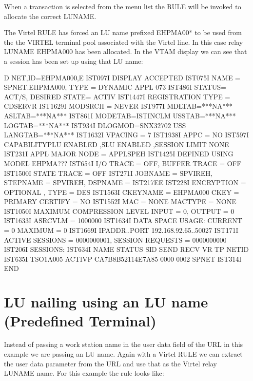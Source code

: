 \documentclass[letterpaper,10pt,english]{sphinxmanual}
\begin{document}

When a transaction is selected from the menu list the RULE will be invoked to allocate the correct LUNAME.


The Virtel RULE has forced an LU name prefixed EHPMA00* to be used from the the VIRTEL terminal pool associated with the Virtel line. In this case relay LUNAME EHPMA000 has been allocated. In the VTAM display we can see that a session has been set up using that LU name:

\begin{sphinxVerbatim}[commandchars=\\\{\}]
D NET,ID=EHPMA000,E
IST097I DISPLAY ACCEPTED
IST075I NAME = SPNET.EHPMA000, TYPE = DYNAMIC APPL 073
IST486I STATUS= ACT/S, DESIRED STATE= ACTIV
IST1447I REGISTRATION TYPE = CDSERVR
IST1629I MODSRCH = NEVER
IST977I MDLTAB=***NA*** ASLTAB=***NA***
IST861I MODETAB=ISTINCLM USSTAB=***NA*** LOGTAB=***NA***
IST934I DLOGMOD=SNX32702 USS LANGTAB=***NA***
IST1632I VPACING = 7
IST1938I APPC = NO
IST597I CAPABILITY\PYGZhy{}PLU ENABLED ,SLU ENABLED ,SESSION LIMIT NONE
IST231I APPL MAJOR NODE = APPLSPEH
IST1425I DEFINED USING MODEL EHPMA???
IST654I I/O TRACE = OFF, BUFFER TRACE = OFF
IST1500I STATE TRACE = OFF
IST271I JOBNAME = SPVIREH, STEPNAME = SPVIREH, DSPNAME = IST217EE
IST228I ENCRYPTION = OPTIONAL , TYPE = DES
IST1563I CKEYNAME = EHPMA000 CKEY = PRIMARY CERTIFY = NO
IST1552I MAC = NONE MACTYPE = NONE
IST1050I MAXIMUM COMPRESSION LEVEL \PYGZhy{} INPUT = 0, OUTPUT = 0
IST1633I ASRCVLM = 1000000
IST1634I DATA SPACE USAGE: CURRENT = 0 MAXIMUM = 0
IST1669I IPADDR..PORT 192.168.92.65..50027
IST171I ACTIVE SESSIONS = 0000000001, SESSION REQUESTS = 0000000000
IST206I SESSIONS:
IST634I NAME STATUS SID SEND RECV VR TP NETID
IST635I TSO1A005 ACTIV\PYGZhy{}P CA7B8B52114E7A85 0000 0002 SPNET
IST314I END
\end{sphinxVerbatim}

\ignorespaces 

\section{LU nailing using an LU name (Predefined Terminal)}
\label{\detokenize{Customization:lu-nailing-using-an-lu-name-predefined-terminal}}\label{\detokenize{Customization:index-57}}
Instead of passing a work station name in the user data field of the URL in this example we are passing an LU name. Again with a Virtel RULE we can extract the user data parameter from the URL and use that as the Virtel relay LUNAME name. For this example the rule looks like:
\end{document}

